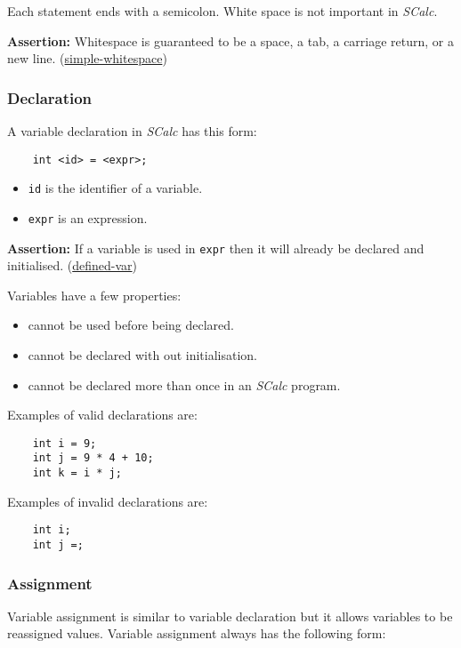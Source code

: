 \documentclass{article}
\newcommand{\code}[1]{\texttt{\textmd{#1}}}
\newcommand{\assertion}[2]{\textbf{Assertion: }#1 (\hyperlink{#2}{#2})}
\begin{document}
Each statement ends with a semicolon. White space is not important in \textit{SCalc}.

\assertion{Whitespace is guaranteed to be a space, a tab, a carriage return, or a new
line.}{simple-whitespace}

\subsubsection{Declaration}
\label{sssec:declaration}

A variable declaration in
\textit{SCalc} has this form:
\begin{lstlisting}
	int <id> = <expr>;
\end{lstlisting}

\begin{itemize}
	\item \code{id} is the identifier of a variable.
	\item \code{expr} is an expression.
\end{itemize}

\assertion{If a variable is used in \code{expr} then it will already be declared and initialised.}
{defined-var}

Variables have a few properties:
\begin{itemize}
  \item cannot be used before being declared.
  \item cannot be declared with out initialisation.
  \item cannot be declared more than once in an \textit{SCalc} program.
\end{itemize}

Examples of valid declarations are:
\begin{lstlisting}
	int i = 9;
	int j = 9 * 4 + 10;
	int k = i * j;
\end{lstlisting}

Examples of invalid declarations are:
\begin{lstlisting}
	int i;
	int j =;
\end{lstlisting}

\subsubsection{Assignment}
\label{sssec:assignment}

Variable assignment is similar to variable declaration but it allows variables to be reassigned values. Variable
assignment always has the following form:
\end{document}
